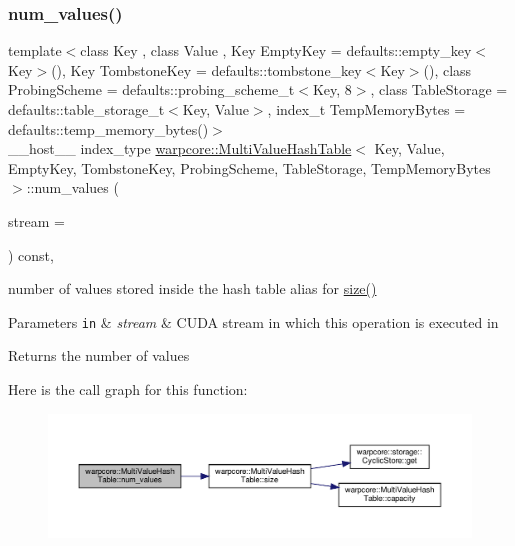 \subsubsection{\texorpdfstring{num\+\_\+values()}{num\_values()}\hspace{0.1cm}{\footnotesize\ttfamily [3/3]}}
{\footnotesize\ttfamily template$<$class Key , class Value , Key Empty\+Key = defaults\+::empty\+\_\+key$<$\+Key$>$(), Key Tombstone\+Key = defaults\+::tombstone\+\_\+key$<$\+Key$>$(), class Probing\+Scheme  = defaults\+::probing\+\_\+scheme\+\_\+t$<$\+Key, 8$>$, class Table\+Storage  = defaults\+::table\+\_\+storage\+\_\+t$<$\+Key, Value$>$, index\+\_\+t Temp\+Memory\+Bytes = defaults\+::temp\+\_\+memory\+\_\+bytes()$>$ \\
\+\_\+\+\_\+host\+\_\+\+\_\+ index\+\_\+type \hyperlink{classwarpcore_1_1MultiValueHashTable}{warpcore\+::\+Multi\+Value\+Hash\+Table}$<$ Key, Value, Empty\+Key, Tombstone\+Key, Probing\+Scheme, Table\+Storage, Temp\+Memory\+Bytes $>$\+::num\+\_\+values (\begin{DoxyParamCaption}\item[{const cuda\+Stream\+\_\+t}]{stream = {} }\end{DoxyParamCaption}) const\hspace{0.3cm}{\ttfamily [inline]}, {\ttfamily [noexcept]}}



number of values stored inside the hash table  alias for {\ttfamily \hyperlink{classwarpcore_1_1MultiValueHashTable_a1be160768bafcae409e3a37ee2829d9f}{size()}} 


\begin{DoxyParams}[1]{Parameters}
\mbox{\tt in}  & {\em stream} & C\+U\+DA stream in which this operation is executed in \\
\hline
\end{DoxyParams}
\begin{DoxyReturn}{Returns}
the number of values 
\end{DoxyReturn}
Here is the call graph for this function\+:
\nopagebreak
\begin{figure}[H]
\begin{center}
\leavevmode
\includegraphics[width=350pt]{classwarpcore_1_1MultiValueHashTable_afba396891eeb4902e22b112bbafe7945_cgraph}
\end{center}
\end{figure}
\mbox{\label{classwarpcore_1_1MultiValueHashTable_a239a45feb31e995163b4e22ec9dab446}} 
